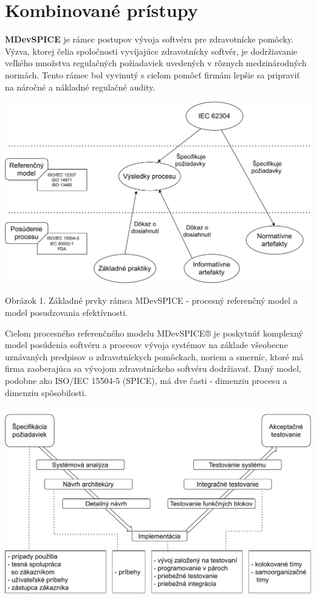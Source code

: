 \documentclass[10pt,twoside,slovak,a4paper]{article}
\begin{document}
\section{Kombinované prístupy}
\textbf{MDevSPICE} je rámec postupov vývoja softvéru pre zdravotnícke pomôcky. Výzva, ktorej čelia spoločnosti vyvíjajúce zdravotnícky softvér, je dodržiavanie veľkého množstva regulačných požiadaviek uvedených v rôznych medzinárodných normách. Tento rámec bol vyvinutý s cieľom pomôcť firmám lepšie sa pripraviť na náročné a nákladné regulačné audity\cite{mccaffery2019}.

\includegraphics[scale=0.5]{MDevSPICE.pdf}

Obrázok 1. Základné prvky rámca MDevSPICE\cite{ramecmd} - procesný referenčný model a model posudzovania efektívnosti.

Cieľom procesného referenčného modelu MDevSPICE® je poskytnúť komplexný model posúdenia softvéru a procesov vývoja systémov na základe všeobecne uznávaných predpisov o zdravotníckych pomôckach, noriem a smerníc, ktoré má firma zaoberajúca sa vývojom zdravotníckeho softvéru dodržiavať. Daný model, podobne ako ISO/IEC 15504-5 (SPICE), má dve časti - dimenziu procesu a dimenziu spôsobilosti.

\includegraphics[scale=0.5]{avmodel.pdf}
\end{document}
